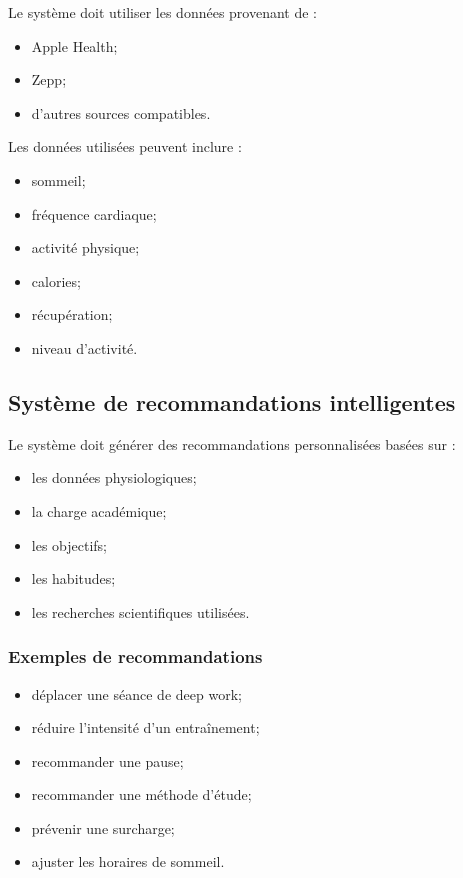 \documentclass[12pt]{article}
\begin{document}
Le système doit utiliser les données provenant de :
\begin{itemize}
    \item Apple Health;
    \item Zepp;
    \item d’autres sources compatibles.
\end{itemize}

Les données utilisées peuvent inclure :
\begin{itemize}
    \item sommeil;
    \item fréquence cardiaque;
    \item activité physique;
    \item calories;
    \item récupération;
    \item niveau d’activité.
\end{itemize}

\subsection{Système de recommandations intelligentes}

Le système doit générer des recommandations personnalisées basées sur :
\begin{itemize}
    \item les données physiologiques;
    \item la charge académique;
    \item les objectifs;
    \item les habitudes;
    \item les recherches scientifiques utilisées.
\end{itemize}

\subsubsection{Exemples de recommandations}

\begin{itemize}
    \item déplacer une séance de deep work;
    \item réduire l’intensité d’un entraînement;
    \item recommander une pause;
    \item recommander une méthode d’étude;
    \item prévenir une surcharge;
    \item ajuster les horaires de sommeil.
\end{itemize}
\end{document}
